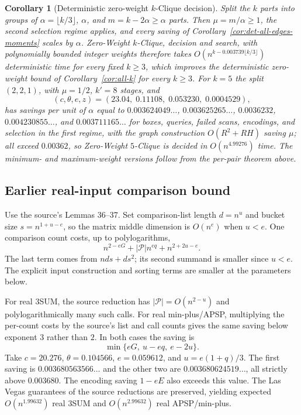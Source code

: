 \documentclass[11pt]{article}
\newtheorem{corollary}[theorem]{Corollary}
\begin{document}
\begin{corollary}[Deterministic zero-weight $k$-Clique decision]
\label{cor:det-clique-decision}
Split the $k$ parts into groups of $\alpha=\lfloor k/3\rfloor$, $\alpha$, and
$m=k-2\alpha\ge\alpha$ parts. Then $\mu=m/\alpha\ge1$, the second selection
regime applies, and every saving of Corollary~\ref{cor:det-all-edges-moments}
scales by $\alpha$. Zero-Weight $k$-Clique, decision and search, with polynomially
bounded integer weights therefore takes
$O(n^{k-0.003739\lfloor k/3\rfloor})$ deterministic time for every fixed
$k\ge3$, which improves the deterministic zero-weight bound of
Corollary~\ref{cor:all-k} for every $k\ge3$. For $k=5$ the split $(2,2,1)$,
with $\mu=1/2$, $k'=8$ stages, and
\[
(c,\theta,e,z)=(23.04,\;0.11108,\;0.053230,\;0.0004529),
\]
has savings per unit of $\alpha$ equal to $0.003624049\ldots$, $0.003625265\ldots$,
$0.0036232$, $0.004230855\ldots$, and $0.003711165\ldots$ for boxes,
queries, failed scans, encodings, and selection in the first regime, with
the graph construction $O(R^2+RH)$ saving $\mu$; all exceed $0.00362$, so
Zero-Weight $5$-Clique is decided in $O(n^{4.99276})$ time. The minimum- and
maximum-weight versions follow from the per-pair theorem above.
\end{corollary}

\subsection*{Earlier real-input comparison bound}
Use the source's Lemmas 36--37. Set comparison-list length $d=n^u$ and
bucket size $s=n^{1+u-e}$, so the matrix middle dimension is $O(n^e)$
when $u<e$. One comparison count costs, up to polylogarithms,
\[
n^{2-eG}+|\mathcal P|n^{eq}+n^{2+2u-e}.
\]
The last term comes from $nds+ds^2$; its second summand is smaller since
$u<e$. The explicit input construction and sorting terms are smaller at
the parameters below.

For real 3SUM, the source reduction has $|\mathcal P|=O(n^{2-u})$ and
polylogarithmically many such calls. For real min-plus/APSP, multiplying the
per-count costs by the source's list and call counts gives the same saving
below exponent $3$ rather than $2$. In both cases the saving is
\[
\min\{eG,\ u-eq,\ e-2u\}.
\]
Take $c=20.276$, $\theta=0.104566$, $e=0.059612$, and
$u=e(1+q)/3$. The first saving is $0.003680563566\ldots$ and the other
two are $0.003680624519\ldots$, all strictly above $0.003680$.
The encoding saving $1-eE$ also exceeds this value.
The Las Vegas guarantees of the source reductions are preserved, yielding
expected $O(n^{1.99632})$ real 3SUM and $O(n^{2.99632})$ real APSP/min-plus.
\end{document}
